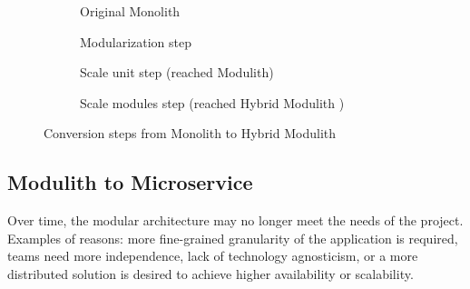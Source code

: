 \begin{figure}
    \centering
    \begin{subfigure}{.5\textwidth}
        \centering
        
        \caption{Original Monolith}
    \end{subfigure}%
    \begin{subfigure}{.5\textwidth}
        \centering
        
        \caption{Modularization step}
    \end{subfigure}
    \begin{subfigure}{\textwidth}
        \centering
        
        \caption{Scale unit step (reached Modulith)\label{fig:scale_as_unit}}
    \end{subfigure}%
    \hfill
    \begin{subfigure}{\textwidth}
        \centering
        
        \caption{Scale modules step (reached Hybrid Modulith \label{fig:hybrid_modulith})}
    \end{subfigure}
    \caption{Conversion steps from Monolith to Hybrid Modulith}
    \label{fig:monolith_to_modulith_steps}
\end{figure}


\subsection{Modulith to Microservice}
\label{subsection:modulith_to_microservices}
Over time, the modular architecture may no longer meet the needs of the project. Examples of reasons: more fine-grained granularity of the application is required, teams need more independence, lack of technology agnosticism, or a more distributed solution is desired to achieve higher availability or scalability.

